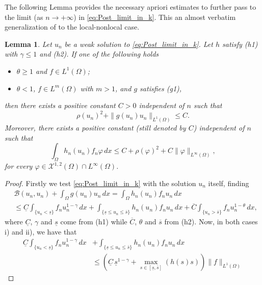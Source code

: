 \documentclass[11pt,a4paper]{amsart}
\theoremstyle{definition}
\theoremstyle{plain}
\newtheorem{lemma}[definition]{Lemma}
\numberwithin{equation}{section}
\begin{document}
{The following Lemma provides the necessary apriori estimates to further pass to the limit (as $n\to +\infty$) in \eqref{eq:Post_limit_in_k}. This an almost verbatim generalization of \cite[Lemma 4.1]{Oliva} to the local-nonlocal case.  
  
\begin{lemma} \label{lem:propun}
Let $u_n$ be a weak solution to \eqref{eq:Post_limit_in_k}.
Let $h$ satisfy {\rm (h1)} with $\gamma \leq 1$ and {\rm (h2)}. If one of the following holds
\begin{itemize}
\item[i)] $\theta \geq 1$ and $f\in L^{1}(\Omega)$;
\item[ii)] $\theta <1$, $f\in L^{m}(\Omega)$ with $m>1$, and $g$ satisfies {\rm (g1)},
\end{itemize}
\noindent then there exists a positive constant $C>0$  independent of $n$ such that
\begin{equation}\label{eq:Apriori_estimates}
\rho(u_n)^2 + \|g(u_n)u_n\|_{L^{1}(\Omega)} \leq C.
\end{equation}
Moreover, there exists a positive constant (still denoted by $C$) independent of $n$ such that
\begin{equation}\label{eq:Apriori_estimates_2}
\int_{\Omega}h_n(u_n)f_n \varphi\,dx \leq C + \rho(\varphi)^2 + C\|\varphi\|_{L^{\infty}(\Omega)},
\end{equation}
\noindent for every $\varphi \in \mathcal{X}^{1,2}(\Omega)\cap L^{\infty}(\Omega)$.
\end{lemma}  
  \begin{proof}
  Firstly we test \eqref{eq:Post_limit_in_k} with the solution $u_n$ itself, finding
  \begin{equation}\label{eq:testing_with_u_n}
  \begin{aligned}
  &\mathcal{B}(u_n,u_n) + \int_{\Omega}g(u_n)u_n\,dx = \int_{\Omega}h_n(u_n)f_n u_n\,dx\\ &\leq \underline{C} \int_{\{u_n <\underline{s}\}}f_n u_n^{1-\gamma}\,dx  + \int_{\{\underline{s}\leq u_n \leq \overline{s}\}}h_n(u_n)f_n u_n\,dx + \overline{C}\int_{\{u_n>\overline{s}\}}f_n u_n^{1-\theta}\,dx,
  \end{aligned}
  \end{equation}
  \noindent where $\underline{C}$, $\gamma$ and $\underline{s}$ come from {\rm (h1)} while $\overline{C}$, $\theta$ and $\overline{s}$ from {\rm (h2)}.
  Now, in both cases i) and ii), we have that 
  \begin{equation}\label{eq:Holding_for_i_and_ii}
  \begin{aligned}
  \underline{C} \int_{\{u_n <\underline{s}\}}f_n u_n^{1-\gamma}\,dx  & + \int_{\{\underline{s}\leq u_n \leq \overline{s}\}}h_n(u_n)f_n u_n\,dx \\
&\leq \left( \underline{C}\, \underline{s}^{1-\gamma} + \max_{s \in [\underline{s},\overline{s}]}(h(s)s)\right)\|f\|_{L^{1}(\Omega)}
\end{aligned}
  \end{equation}


\end{proof}}
\end{document}
